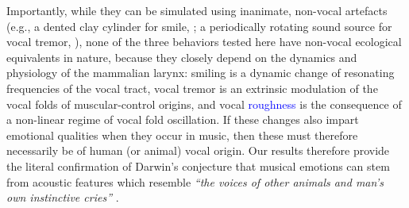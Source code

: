 \documentclass[openacc]{rsprocb_new}%
\begin{document}
Importantly, while they can be simulated using inanimate, non-vocal artefacts (e.g., a dented clay cylinder for smile, \cite{OHA80}; a periodically rotating sound source for vocal tremor, \cite{LES52}), none of the three behaviors tested here have non-vocal ecological equivalents in nature, because they closely depend on the dynamics and physiology of the mammalian larynx: smiling is a dynamic change of resonating frequencies of the vocal tract, vocal tremor is an extrinsic modulation of the vocal folds of muscular-control origins, and vocal \textcolor{blue}{roughness} is the consequence of a non-linear regime of vocal fold oscillation. If these changes also impart emotional qualities when they occur in music, then these must therefore necessarily be of human (or animal) vocal origin. Our results therefore provide the literal confirmation of Darwin's conjecture that musical emotions can stem from acoustic features which resemble \emph{``the voices of other animals and man's own instinctive cries''} \cite{DAR74}.   
\end{document}
